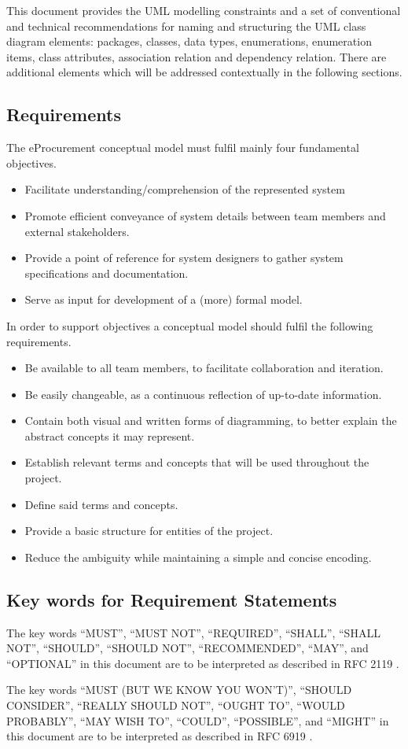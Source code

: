 	This document provides the UML modelling constraints and a set of conventional and technical recommendations for naming and structuring the UML class diagram elements: packages, classes, data types, enumerations, enumeration items, class attributes, association relation and dependency relation. There are additional elements which will be addressed contextually in the following sections. 

	\subsection{Requirements}
	\label{sec:requirements}
	
	The eProcurement conceptual model must fulfil mainly four fundamental objectives.
	\begin{itemize}
		\item Facilitate understanding/comprehension of the represented system
		\item Promote efficient conveyance of system details between team members and external stakeholders.
		\item Provide a point of reference for system designers to gather system specifications and documentation.
		\item Serve as input for development of a (more) formal model.		
	\end{itemize}
	
	In order to support objectives a conceptual model should fulfil the following requirements.
	\begin{itemize}
		\item Be available to all team members, to facilitate collaboration and iteration.
		\item Be easily changeable, as a continuous reflection of up-to-date information.
		\item Contain both visual and written forms of diagramming, to better explain the abstract concepts it may represent.
		\item Establish relevant terms and concepts that will be used throughout the project.
		\item Define said terms and concepts.
		\item Provide a basic structure for entities of the project.
		\item Reduce the ambiguity while maintaining a simple and concise encoding.  
	\end{itemize}
	
	\subsection{Key words for Requirement Statements}
	\label{sec:keywords}
	
	The key words ``MUST'', ``MUST NOT'', ``REQUIRED'', ``SHALL'', ``SHALL  NOT'', ``SHOULD'', ``SHOULD NOT'', ``RECOMMENDED'',  ``MAY'', and ``OPTIONAL'' in this document are to be interpreted as described in RFC 2119 \cite{rfc2119}.
	
	The key words ``MUST (BUT WE KNOW YOU WON'T)'', ``SHOULD CONSIDER'', ``REALLY SHOULD NOT'', ``OUGHT TO'', ``WOULD PROBABLY'', ``MAY WISH TO'', ``COULD'', ``POSSIBLE'', and ``MIGHT'' in this document are to be interpreted as described in RFC 6919 \cite{rfc6919}.